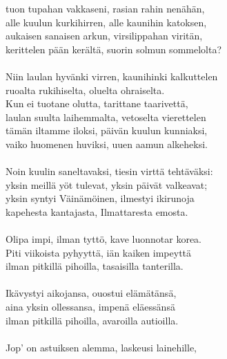 tuon tupahan vakkaseni, rasian rahin nenähän,               \\
alle kuulun kurkihirren, alle kaunihin katoksen,            \\
aukaisen sanaisen arkun, virsilippahan viritän,             \\
kerittelen pään kerältä, suorin solmun sommelolta?          \\
                                                            \\
Niin laulan hyvänki virren, kaunihinki kalkuttelen          \\
ruoalta rukihiselta, oluelta ohraiselta.                    \\
Kun ei tuotane olutta, tarittane taarivettä,                \\
laulan suulta laihemmalta, vetoselta vierettelen            \\
tämän iltamme iloksi, päivän kuulun kunniaksi,              \\
vaiko huomenen huviksi, uuen aamun alkeheksi.               \\
                                                            \\
Noin kuulin saneltavaksi, tiesin virttä tehtäväksi:         \\
yksin meillä yöt tulevat, yksin päivät valkeavat;           \\
yksin syntyi Väinämöinen, ilmestyi ikirunoja                \\
kapehesta kantajasta, Ilmattaresta emosta.                  \\
                                                            \\
Olipa impi, ilman tyttö, kave luonnotar korea.              \\
Piti viikoista pyhyyttä, iän kaiken impeyttä                \\
ilman pitkillä pihoilla, tasaisilla tanterilla.             \\
                                                            \\
Ikävystyi aikojansa, ouostui elämätänsä,                    \\
aina yksin ollessansa, impenä eläessänsä                    \\
ilman pitkillä pihoilla, avaroilla autioilla.               \\
                                                            \\
Jop' on astuiksen alemma, laskeusi lainehille,              \\
